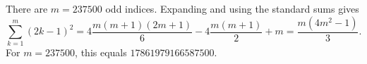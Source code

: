 There are $m=237500$ odd indices. Expanding and using the standard sums gives
\[
\sum_{k=1}^{m}(2k-1)^2
=4\dfrac{m(m+1)(2m+1)}{6}-4\dfrac{m(m+1)}{2}+m
=\dfrac{m(4m^2-1)}{3}.
\]
For $m=237500$, this equals $\boxed{17861979166587500}$.

